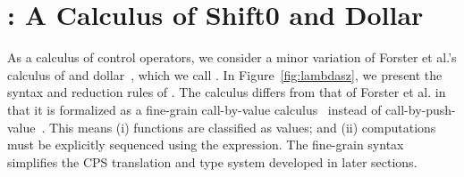 \newcommand{\Lambdasz}{
\begin{figure}[t]

\lefttext{Syntax}
\begin{align*}
V, W &::= x \mid \abs{x}{M} && \text{Values} \\
M, N &::= \ret{V} \mid \app{V}{V} \mid \letin{x}{M}{M} \mid
       \shiftz{k}{M} \mid \dollarret{M}{x}{M} && \text{Computations}
\end{align*}

\medskip

\lefttext{Evaluation Contexts}
\begin{align*}
E &::= \hole \mid \letin{x}{E}{M} \mid \dollarret{E}{x}{M} 
  && \text{General Contexts} \\
F &::= \hole \mid \letin{x}{F}{M} 
  && \text{Pure Contexts}
\end{align*}

\medskip

\lefttext{Reduction}
\begin{align*}
E[\app{(\abs{x}{M})}{V}]
  &\reduce E[\subst{M}{x}{V}]
  && \rulename{$\beta_v$} \\
  E[\letin{x}{\ret{V}}{M}]
  &\reduce E[\subst{M}{x}{V}]
  && \rulename{$\zeta_v$} \\
  E[\dollarret{\ret{V}}{x}{M}]
  &\reduce E[\subst{M}{x}{V}]
  && \rulename{$\beta_{\$}$} \\
  E[\dollarret{F[\shiftz{k}{M}]}{x}{N}]
  &\reduce E[\subst{M}{k}{\abs{y}{\dollarret{F[\ret{y}]}{x}{N}}}]
  && \rulename{$\beta_{\shiftzsym}$}
\end{align*}

\caption{Syntax and Reduction Rules of \lambdasz}
\label{fig:lambdasz}
\end{figure}
}

\section{\lambdasz: A Calculus of Shift0 and Dollar}
\label{sec:lambdasz}

\setcounter{footnote}{0}

As a calculus of control operators, we consider a minor variation of
Forster et al.'s calculus of \shiftztt and dollar~\cite{forster-jfp},
which we call \lambdasz.
In Figure~\ref{fig:lambdasz}, we present the syntax and reduction rules
of \lambdasz.
The calculus differs from that of Forster et al. in that it is formalized
as a fine-grain call-by-value calculus~\cite{levy-finegrain} instead of
call-by-push-value~\cite{levy-cbpv}.
This means (i) functions are classified as values; and (ii) computations
must be explicitly sequenced using the  expression.
The fine-grain syntax simplifies the CPS translation and type system
developed in later sections.

